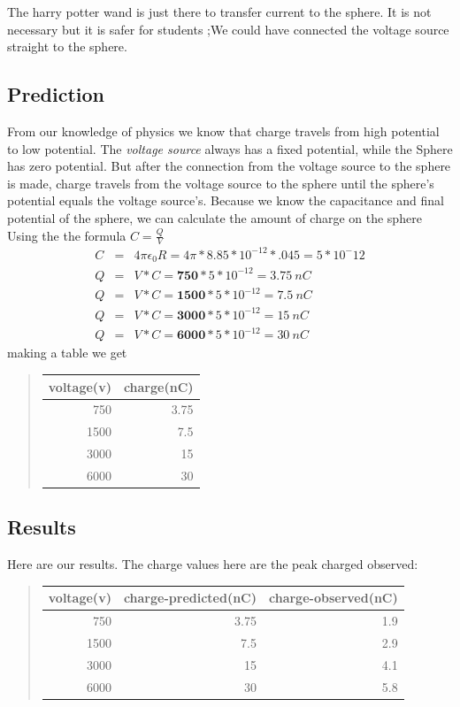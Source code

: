 \documentclass[12pt]{article}
\begin{document}
	 The harry potter wand is just there to transfer current to the sphere. It is not necessary but it is safer for students ;We could have connected the voltage source straight to the sphere. 

\subsection*{Prediction}
	From our knowledge of physics we know that charge travels from high potential to low potential. The \emph{voltage source} always has a fixed potential, while the Sphere has zero potential. But after the connection from the voltage source to the sphere is made, charge travels from the voltage source to the sphere until the sphere's potential equals the voltage source's. Because we know the capacitance and final potential of the sphere, we can calculate the amount of charge on the sphere Using the the formula $C = \frac{Q}{V}$ 
	\begin{eqnarray}
	C & = & 4\pi\epsilon_0R = 4 \pi *8.85*10^{-12} *.045 = 5*10^-12\\
	Q &= & V * C = \mathbf{750} * 5 * 10^{-12} = 3.75 \ nC \\
	Q &= & V * C = \mathbf{1500} * 5 * 10^{-12} = 7.5 \ nC \\
	Q &= & V * C = \mathbf{3000} * 5 * 10^{-12} = 15 \ nC \\
	Q &= & V * C = \mathbf{6000} * 5 * 10^{-12} = 30 \ nC 
	\end{eqnarray}
	making a table we get
	\begin{quote}
	\begin{tabular}{|r|r|}
	\hline 
	voltage(v) & charge(nC) \\
	\hline 
	750 & 3.75 \\
	1500 & 7.5 \\
	3000 & 15 \\
	6000 & 30 \\
	\hline
	\end{tabular}
	\end{quote}

\subsection*{Results}
	Here are our results. The charge values here are the peak charged observed:
	\begin{quote}
	\begin{tabular}{|r|r|r|}
	\hline 
	voltage(v) & charge-predicted(nC) & charge-observed(nC) \\
	\hline 
	750 & 3.75 & 1.9 \\ 
	1500 & 7.5 & 2.9\\
	3000 & 15 & 4.1 \\
	6000 & 30 & 5.8 \\
	\hline
	\end{tabular}
	\end{quote}
\end{document}
